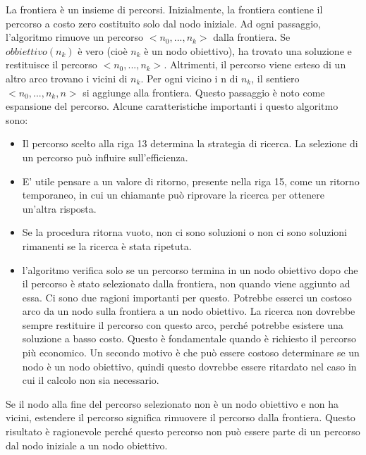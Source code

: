 \documentclass[a4paper]{extarticle}
\begin{document}
La frontiera è un insieme di percorsi. Inizialmente, la frontiera contiene il percorso a costo zero costituito solo dal nodo iniziale. Ad ogni passaggio, l'algoritmo rimuove un percorso $<n_0,...,n_k>$ dalla frontiera. Se $obbiettivo(n_k)$ è vero (cioè $n_k$ è un nodo obiettivo), ha trovato una soluzione e restituisce il percorso $<n_0,...,n_k>$. Altrimenti, il percorso viene esteso di un altro arco trovano i vicini di $n_k$. Per ogni vicino i n di $n_k$, il sentiero $<n_0,...,n_k,n>$ si aggiunge alla frontiera. Questo passaggio è noto come espansione del percorso. Alcune caratteristiche importanti i questo algoritmo sono: \begin{itemize}
\item Il percorso scelto alla riga 13 determina la strategia di ricerca. La selezione di un percorso può influire sull'efficienza.
\item E' utile pensare a un valore di ritorno, presente nella riga 15, come un ritorno temporaneo, in cui un chiamante può riprovare la ricerca per ottenere un'altra risposta.
\item Se la procedura ritorna vuoto, non ci sono soluzioni o non ci sono soluzioni rimanenti se la ricerca è stata ripetuta.
\item l'algoritmo verifica solo se un percorso termina in un nodo obiettivo dopo che il percorso è stato selezionato dalla frontiera, non quando viene aggiunto ad essa. Ci sono due ragioni importanti per questo. Potrebbe esserci un costoso arco da un nodo sulla frontiera a un nodo obiettivo. La ricerca non dovrebbe sempre restituire il percorso con questo arco, perché potrebbe esistere una soluzione a basso costo. Questo è fondamentale quando è richiesto il percorso più economico. Un secondo motivo è che può essere costoso determinare se un nodo è un nodo obiettivo, quindi questo dovrebbe essere ritardato nel caso in cui il calcolo non sia necessario.
\end{itemize}

Se il nodo alla fine del percorso selezionato non è un nodo obiettivo e non ha vicini, estendere il percorso significa rimuovere il percorso dalla frontiera. Questo risultato è ragionevole perché questo percorso non può essere parte di un percorso dal nodo iniziale a un nodo obiettivo. 
\end{document}
